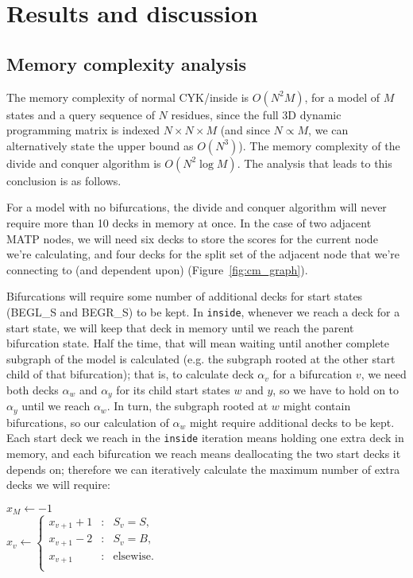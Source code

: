 \documentclass[11pt]{article}
\begin{document}
\section{Results and discussion}

\subsection{Memory complexity analysis}

The memory complexity of normal CYK/inside is $O(N^2M)$, for a model
of $M$ states and a query sequence of $N$ residues, since the full 3D
dynamic programming matrix is indexed $N \times N \times M$ (and since
$N \propto M$, we can alternatively state the upper bound as
$O(N^3)$). The memory complexity of the divide and conquer algorithm
is $O(N^2 \log M)$. The analysis that leads to this conclusion is as
follows.

For a model with no bifurcations, the divide and conquer algorithm
will never require more than 10 decks in memory at once. In the case
of two adjacent MATP nodes, we will need six decks to store the scores
for the current node we're calculating, and four decks for the split
set of the adjacent node that we're connecting to (and dependent
upon) (Figure~\ref{fig:cm_graph}).

Bifurcations will require some number of additional decks for start
states (BEGL\_S and BEGR\_S) to be kept. In \texttt{inside}, whenever
we reach a deck for a start state, we will keep that deck in memory
until we reach the parent bifurcation state. Half the time, that will
mean waiting until another complete subgraph of the model is
calculated (e.g. the subgraph rooted at the other start child of that
bifurcation); that is, to calculate deck $\alpha_v$ for a bifurcation
$v$, we need both decks $\alpha_w$ and $\alpha_y$ for its child start
states $w$ and $y$, so we have to hold on to $\alpha_y$ until we reach
$\alpha_w$. In turn, the subgraph rooted at $w$ might contain
bifurcations, so our calculation of $\alpha_w$ might require
additional decks to be kept. Each start deck we reach in the
\texttt{inside} iteration means holding one extra deck in memory, and
each bifurcation we reach means deallocating the two start decks it
depends on; therefore we can iteratively calculate the maximum number
of extra decks we will require:

\begin{algorithm}
\begin{algtab*}
  $x_M \leftarrow -1$\\
     $x_v \leftarrow \left\{ 
       \begin{array}{rcl} 
        x_{v+1} + 1 &:& S_v = S,\\
        x_{v+1} - 2 &:& S_v = B,\\
        x_{v+1}     &:& \mbox{elsewise.}\\
       \end{array} \right.$\\
  \algend
  \\
\end{algtab*}
\end{algorithm}
\end{document}
